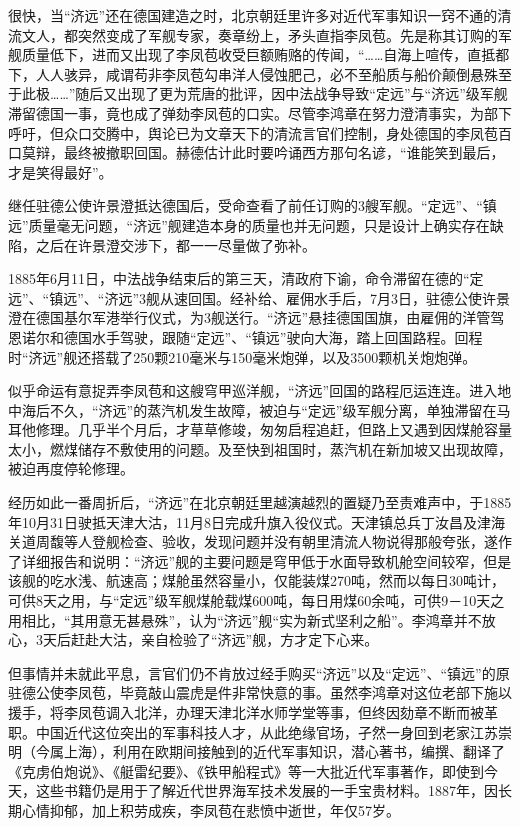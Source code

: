\documentclass[12pt,UTF8]{ctexbook}
\begin{document}
很快，当“济远”还在德国建造之时，北京朝廷里许多对近代军事知识一窍不通的清流文人，都突然变成了军舰专家，奏章纷上，矛头直指李凤苞。先是称其订购的军舰质量低下，进而又出现了李凤苞收受巨额贿赂的传闻，“……自海上喧传，直抵都下，人人骇异，咸谓苟非李凤苞勾串洋人侵蚀肥己，必不至船质与船价颠倒悬殊至于此极……”随后又出现了更为荒唐的批评，因中法战争导致“定远”与“济远”级军舰滞留德国一事，竟也成了弹劾李凤苞的口实。尽管李鸿章在努力澄清事实，为部下呼吁，但众口交腾中，舆论已为文章天下的清流言官们控制，身处德国的李凤苞百口莫辩，最终被撤职回国。赫德估计此时要吟诵西方那句名谚，“谁能笑到最后，才是笑得最好”。

继任驻德公使许景澄抵达德国后，受命查看了前任订购的3艘军舰。“定远”、“镇远”质量毫无问题，“济远”舰建造本身的质量也并无问题，只是设计上确实存在缺陷，之后在许景澄交涉下，都一一尽量做了弥补。

1885年6月11日，中法战争结束后的第三天，清政府下谕，命令滞留在德的“定远”、“镇远”、“济远”3舰从速回国。经补给、雇佣水手后，7月3日，驻德公使许景澄在德国基尔军港举行仪式，为3舰送行。“济远”悬挂德国国旗，由雇佣的洋管驾恩诺尔和德国水手驾驶，跟随“定远”、“镇远”驶向大海，踏上回国路程。回程时“济远”舰还搭载了250颗210毫米与150毫米炮弹，以及3500颗机关炮炮弹。

似乎命运有意捉弄李凤苞和这艘穹甲巡洋舰，“济远”回国的路程厄运连连。进入地中海后不久，“济远”的蒸汽机发生故障，被迫与“定远”级军舰分离，单独滞留在马耳他修理。几乎半个月后，才草草修竣，匆匆启程追赶，但路上又遇到因煤舱容量太小，燃煤储存不敷使用的问题。及至快到祖国时，蒸汽机在新加坡又出现故障，被迫再度停轮修理。

经历如此一番周折后，“济远”在北京朝廷里越演越烈的置疑乃至责难声中，于1885年10月31日驶抵天津大沽，11月8日完成升旗入役仪式。天津镇总兵丁汝昌及津海关道周馥等人登舰检查、验收，发现问题并没有朝里清流人物说得那般夸张，遂作了详细报告和说明：“济远”舰的主要问题是穹甲低于水面导致机舱空间较窄，但是该舰的吃水浅、航速高；煤舱虽然容量小，仅能装煤270吨，然而以每日30吨计，可供8天之用，与“定远”级军舰煤舱载煤600吨，每日用煤60余吨，可供9－10天之用相比，“其用意无甚悬殊”，认为“济远”舰“实为新式坚利之船”。李鸿章并不放心，3天后赶赴大沽，亲自检验了“济远”舰，方才定下心来。

但事情并未就此平息，言官们仍不肯放过经手购买“济远”以及“定远”、“镇远”的原驻德公使李凤苞，毕竟敲山震虎是件非常快意的事。虽然李鸿章对这位老部下施以援手，将李凤苞调入北洋，办理天津北洋水师学堂等事，但终因劾章不断而被革职。中国近代这位突出的军事科技人才，从此绝缘官场，孑然一身回到老家江苏崇明（今属上海），利用在欧期间接触到的近代军事知识，潜心著书，编撰、翻译了《克虏伯炮说》、《艇雷纪要》、《铁甲船程式》等一大批近代军事著作，即使到今天，这些书籍仍是用于了解近代世界海军技术发展的一手宝贵材料。1887年，因长期心情抑郁，加上积劳成疾，李凤苞在悲愤中逝世，年仅57岁。
\end{document}
